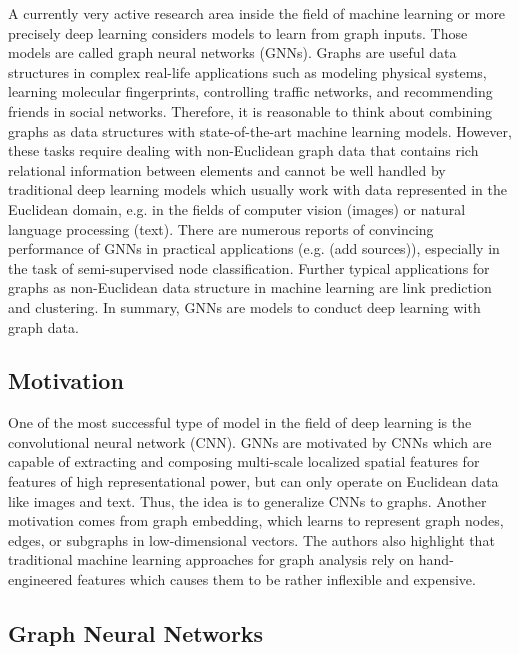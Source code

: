 \documentclass[a4paper,preprint]{sig-alternate}
\begin{document}
A currently very active research area inside the field of machine learning or more precisely deep learning considers models to learn
from graph inputs. Those models are called graph neural networks (GNNs). Graphs are useful data structures in complex real-life
applications such as modeling physical systems, learning molecular fingerprints, controlling traffic networks, and recommending 
friends in social networks.\cite{article}
Therefore, it is reasonable to think about combining graphs as data structures with state-of-the-art machine learning models.
However, these tasks require dealing with non-Euclidean graph data that contains rich relational information between elements and
cannot be well handled by traditional deep learning models which usually work with data represented in the Euclidean domain, e.g. in the
fields of computer vision (images) or natural language processing (text).\cite{article}
There are numerous reports of convincing performance of GNNs in practical applications (e.g. (add sources)),
especially in the task of semi-supervised node classification.\cite{xu2019topology}
Further typical applications for graphs as non-Euclidean data structure in machine learning are link prediction and clustering.\cite{zhou2019graph}
In summary, GNNs are models to conduct deep learning with graph data.

\subsection{Motivation}

One of the most successful type of model in the field of deep learning is the convolutional neural network (CNN).
GNNs are motivated by CNNs which are capable of extracting and composing multi-scale localized spatial features
for features of high representational power, but can only operate on Euclidean data like images and text.\cite{article}
Thus, the idea is to generalize CNNs to graphs.\newline
Another motivation comes from graph embedding, which learns to represent graph nodes, edges, or subgraphs in low-dimensional vectors.\cite{article}
The authors also highlight that traditional machine learning approaches for graph analysis rely on hand-engineered features which causes them
to be rather inflexible and expensive.

\subsection{Graph Neural Networks}
\end{document}
